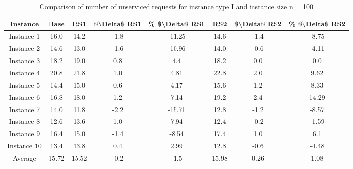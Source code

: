 \begin{table}[H]
\centering
\begin{tabular}{cccccccc}
  \hline
  \textbf{Instance} & \textbf{Base} & \textbf{RS1} & \textbf{\$\textbackslash{}Delta\$  RS1} & \textbf{\% \$\textbackslash{}Delta\$  RS1} & \textbf{RS2} & \textbf{\$\textbackslash{}Delta\$  RS2} & \textbf{\% \$\textbackslash{}Delta\$  RS2} \\\hline
  Instance 1 & 16.0 & 14.2 & -1.8 & -11.25 & 14.6 & -1.4 & -8.75 \\
  Instance 2 & 14.6 & 13.0 & -1.6 & -10.96 & 14.0 & -0.6 & -4.11 \\
  Instance 3 & 18.2 & 19.0 & 0.8 & 4.4 & 18.2 & 0.0 & 0.0 \\
  Instance 4 & 20.8 & 21.8 & 1.0 & 4.81 & 22.8 & 2.0 & 9.62 \\
  Instance 5 & 14.4 & 15.0 & 0.6 & 4.17 & 15.6 & 1.2 & 8.33 \\
  Instance 6 & 16.8 & 18.0 & 1.2 & 7.14 & 19.2 & 2.4 & 14.29 \\
  Instance 7 & 14.0 & 11.8 & -2.2 & -15.71 & 12.8 & -1.2 & -8.57 \\
  Instance 8 & 12.6 & 13.6 & 1.0 & 7.94 & 12.4 & -0.2 & -1.59 \\
  Instance 9 & 16.4 & 15.0 & -1.4 & -8.54 & 17.4 & 1.0 & 6.1 \\
  Instance 10 & 13.4 & 13.8 & 0.4 & 2.99 & 12.8 & -0.6 & -4.48 \\
  Average & 15.72 & 15.52 & -0.2 & -1.5 & 15.98 & 0.26 & 1.08 \\\hline
\end{tabular}
\caption{Comparison of number of unserviced requests for instance type I and instance size n = 100}
\label{tab:wait:resrelocation-nTaxi-comparison_I_100}
\end{table}
